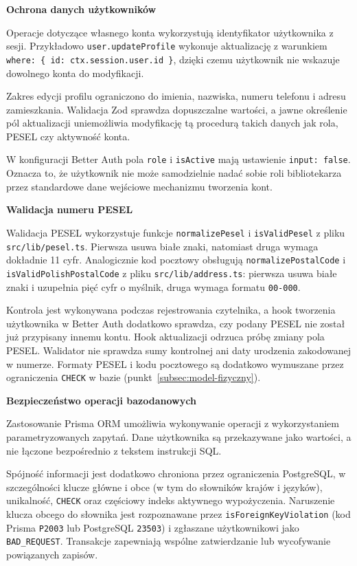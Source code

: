 \documentclass[11pt, a4paper]{article}
\begin{document}
\noindent\textbf{Ochrona danych użytkowników}

Operacje dotyczące własnego konta wykorzystują identyfikator użytkownika z sesji. Przykładowo \texttt{user.updateProfile} wykonuje aktualizację z warunkiem \texttt{where: \{ id: ctx.session.user.id \}}, dzięki czemu użytkownik nie wskazuje dowolnego konta do modyfikacji.

Zakres edycji profilu ograniczono do imienia, nazwiska, numeru telefonu i adresu zamieszkania. Walidacja Zod sprawdza dopuszczalne wartości, a jawne określenie pól aktualizacji uniemożliwia modyfikację tą procedurą takich danych jak rola, PESEL czy aktywność konta.

W konfiguracji Better Auth pola \texttt{role} i \texttt{isActive} mają ustawienie \texttt{input: false}. Oznacza to, że użytkownik nie może samodzielnie nadać sobie roli bibliotekarza przez standardowe dane wejściowe mechanizmu tworzenia kont.

\noindent\textbf{Walidacja numeru PESEL}

Walidacja PESEL wykorzystuje funkcje \texttt{normalizePesel} i \texttt{isValidPesel} z pliku \texttt{src/lib/pesel.ts}. Pierwsza usuwa białe znaki, natomiast druga wymaga dokładnie 11 cyfr. Analogicznie kod pocztowy obsługują \texttt{normalizePostalCode} i \texttt{isValidPolishPostalCode} z pliku \texttt{src/lib/address.ts}: pierwsza usuwa białe znaki i uzupełnia pięć cyfr o myślnik, druga wymaga formatu \texttt{00-000}.

Kontrola jest wykonywana podczas rejestrowania czytelnika, a hook tworzenia użytkownika w Better Auth dodatkowo sprawdza, czy podany PESEL nie został już przypisany innemu kontu. Hook aktualizacji odrzuca próbę zmiany pola PESEL. Walidator nie sprawdza sumy kontrolnej ani daty urodzenia zakodowanej w numerze. Formaty PESEL i kodu pocztowego są dodatkowo wymuszane przez ograniczenia \texttt{CHECK} w bazie (punkt~\ref{subsec:model-fizyczny}).

\noindent\textbf{Bezpieczeństwo operacji bazodanowych}

Zastosowanie Prisma ORM umożliwia wykonywanie operacji z wykorzystaniem parametryzowanych zapytań. Dane użytkownika są przekazywane jako wartości, a nie łączone bezpośrednio z tekstem instrukcji SQL.

Spójność informacji jest dodatkowo chroniona przez ograniczenia PostgreSQL, w szczególności klucze główne i obce (w tym do słowników krajów i języków), unikalność, \texttt{CHECK} oraz częściowy indeks aktywnego wypożyczenia. Naruszenie klucza obcego do słownika jest rozpoznawane przez \texttt{isForeignKeyViolation} (kod Prisma \texttt{P2003} lub PostgreSQL \texttt{23503}) i zgłaszane użytkownikowi jako \texttt{BAD\_REQUEST}.
 Transakcje zapewniają wspólne zatwierdzanie lub wycofywanie powiązanych zapisów.
\end{document}
